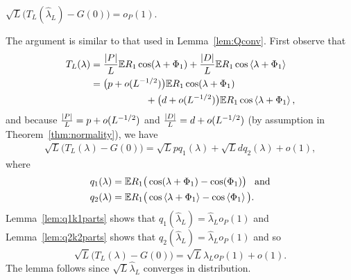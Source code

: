 \documentclass[journal]{IEEEtran}
\begin{document}
\begin{lemma}\label{lem:HLtoG} $\sqrt{L}\big( T_L(\hat{\lambda}_L) - G(0) \big) = o_P(1)$.
\end{lemma}
\begin{IEEEproof}
The argument is similar to that used in Lemma~\ref{lem:Qconv}.  First observe that
\begin{align*}
T_L(\lambda) &= \frac{{\vert P \vert}}{L}{\mathbb E} R_1\cos(\lambda + \Phi_1) + \frac{{\vert D \vert}}{L} {\mathbb E} R_1\cos\left\langle \lambda + \Phi_1 \right\rangle \\
&=  \big( p + o(L^{-1/2}) \big) {\mathbb E} R_1\cos(\lambda + \Phi_1) \\
&\hspace{2cm} + \big( d + o(L^{-1/2}) \big) {\mathbb E} R_1\cos\left\langle \lambda + \Phi_1 \right\rangle,
\end{align*}
and because $\tfrac{{\left\vert P \right\vert}}{L} = p + o(L^{-1/2})$ and $\tfrac{{\left\vert D \right\vert}}{L} = d + o(L^{-1/2})$ (by assumption in Theorem~\ref{thm:normality}), we have
\begin{align*}
\sqrt{L}\big( T_L(\lambda) - G(0) \big) = \sqrt{L}p q_1(\lambda) + \sqrt{L} d q_2(\lambda) + o(1),
\end{align*}
where
\begin{align}
q_1(\lambda) &= {\mathbb E} R_1\big( \cos(\lambda + \Phi_1) - \cos(\Phi_1) \big) \;\;\; \text{and} \nonumber \\
q_2(\lambda) &= {\mathbb E} R_1\big( \cos\left\langle \lambda + \Phi_1 \right\rangle - \cos\left\langle \Phi_1 \right\rangle \big). \label{eq:q2def}
\end{align}
Lemma~\ref{lem:q1k1parts} shows that $q_1(\hat{\lambda}_L) = \hat{\lambda}_Lo_P(1)$ and Lemma~\ref{lem:q2k2parts} shows that $q_2(\hat{\lambda}_L) = \hat{\lambda}_L o_P(1)$ and so
\[
\sqrt{L}\big( T_L(\lambda) - G(0) \big) =\sqrt{L}\hat{\lambda}_L o_P(1) + o(1).
\]
The lemma follows since $\sqrt{L}\hat{\lambda}_L$ converges in distribution.
\end{IEEEproof}
\end{document}
